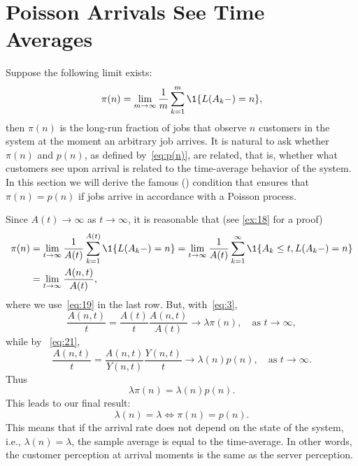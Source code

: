 \section{Poisson Arrivals See Time Averages}
\label{sec:poisson-arrivals-see}



Suppose the following limit exists:
\begin{equation}\label{eq:jaap}
  \pi(n) 
= \lim_{m\to\infty} 
\frac1m\sum_{k=1}^m \1{L(A_k-) = n},
\end{equation}
then $\pi(n)$ is the long-run fraction of jobs that observe $n$ customers in the system at the moment an arbitrary job arrives.
It is natural to ask whether $\pi(n)$ and $p(n)$, as defined by~\cref{eq:p(n)}, are related, that is, whether what customers see upon arrival is related to the time-average behavior of the system.
In this section we will derive the famous  () condition that ensures that $\pi(n)=p(n)$ if jobs arrive in accordance with a Poisson process.


Since $A(t)\to \infty$ as $t\to\infty$, it is reasonable that (see \cref{ex:18} for a proof)
\begin{equation}\label{eq:132}
  \begin{split}
  \pi(n) &= \lim_{t\to\infty} \frac1{A(t)}\sum_{k=1}^{A(t)} \1{L(A_k-) = n} 
= \lim_{t\to\infty} \frac1{A(t)}\sum_{k=1}^\infty \1{A_k \leq t, L(A_k-) = n} \\
  &= \lim_{t\to\infty} \frac{A(n,t)}{A(t)},
  \end{split}
\end{equation}
where we use~\cref{eq:19} in the last row. But,  with~\cref{eq:3}, 
\begin{equation}\label{eq:1333}
 \frac{A(n,t)}{t} 
= \frac{A(t)}t \frac{A(n,t)}{A(t)}
\to \lambda  \pi(n), \quad\text{as } t \to \infty, 
\end{equation}
while by ~\cref{eq:21}, 
\begin{equation*}
\frac{A(n,t)}t = \frac{A(n,t)}{Y(n,t)}\frac{Y(n,t)}t \to \lambda(n) p(n), \quad\text{as } t \to \infty.
\end{equation*}
Thus
\begin{equation}\label{eq:13}
\lambda  \pi(n) = \lambda(n) p(n).
\end{equation}
This leads to our final result:
\begin{equation*}
  \lambda(n) = \lambda \iff \pi(n) = p(n).
\end{equation*}
This means that if the arrival rate does not depend on the state of the system, i.e., $\lambda(n)=\lambda$, the sample average is equal to the time-average.
In other words, the customer perception at arrival moments is the same as the server perception.

